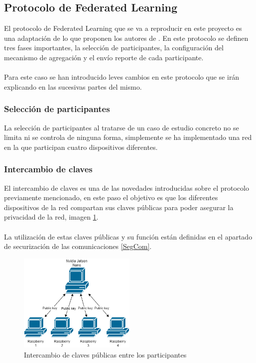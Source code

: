 \subsection{Protocolo de Federated Learning}\label{Protocolo}
El protocolo de Federated Learning que se va a reproducir en este proyecto es una adaptación de lo que proponen los autores de \autocite{bonawitzFederatedLearningScale2019a}. En este protocolo se definen tres fases importantes, la selección de participantes, la configuración del mecanismo de agregación y el envío reporte de cada participante.
\\\\
Para este caso se han introducido leves cambios en este protocolo que se irán explicando en las sucesivas partes del mismo.  

\subsubsection{Selección de participantes}
La selección de participantes al tratarse de un caso de estudio concreto no se limita ni se controla de ninguna forma, simplemente se ha implementado una red en la que participan cuatro dispositivos diferentes.

\subsubsection{Intercambio de claves}
El intercambio de claves es una de las novedades introducidas sobre el protocolo previamente mencionado, en este paso el objetivo es que los diferentes dispositivos de la red compartan sus claves públicas para poder asegurar la privacidad de la red, imagen \ref{fig:PublicKeyShare}. 
\\ \\
La utilización de estas claves públicas y su función están definidas en el apartado de securización de las comunicaciones \ref{SegCom}.
\begin{figure}[H]
    \centering
    \includegraphics[width=0.5\textwidth]{Figuras/Network_public_key.png}    
    \caption{Intercambio de claves públicas entre los participantes} 
    \label{fig:PublicKeyShare}
\end{figure}


